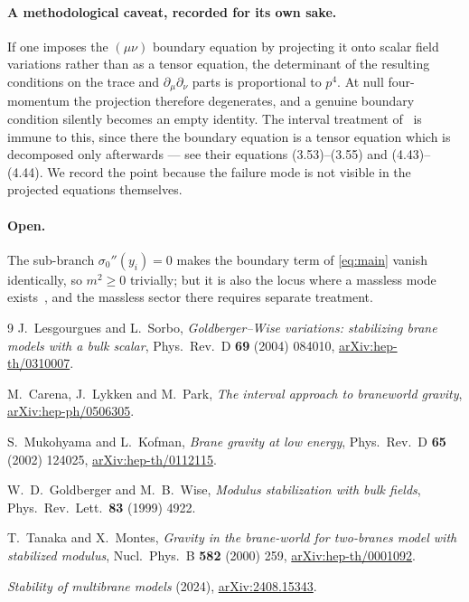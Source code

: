 \documentclass[11pt,a4paper]{article}
\newcommand{\sig}{\sigma_0}
\begin{document}
\paragraph{A methodological caveat, recorded for its own sake.}
If one imposes the $(\mu\nu)$ boundary equation by projecting it onto
scalar field variations rather than as a tensor equation, the
determinant of the resulting conditions on the trace and
$\partial_\mu\partial_\nu$ parts is proportional to $p^4$. At null
four-momentum the projection therefore degenerates, and a genuine
boundary condition silently becomes an empty identity. The interval
treatment of~\cite{CLP} is immune to this, since there the boundary
equation is a tensor equation which is decomposed only afterwards --- see
their equations (3.53)--(3.55) and (4.43)--(4.44). We record the point
because the failure mode is not visible in the projected equations
themselves.

\paragraph{Open.}
The sub-branch $\sig''(y_i)=0$ makes the boundary term of
\eqref{eq:main} vanish identically, so $m^2\ge0$ trivially; but it is
also the locus where a massless mode exists~\cite{LS,MK}, and the
massless sector there requires separate treatment.

\begin{thebibliography}{9}
 J.~Lesgourgues and L.~Sorbo,
\emph{Goldberger--Wise variations: stabilizing brane models with a bulk
scalar}, Phys.\ Rev.\ D \textbf{69} (2004) 084010,
\href{https://arxiv.org/abs/hep-th/0310007}{arXiv:hep-th/0310007}.

 M.~Carena, J.~Lykken and M.~Park,
\emph{The interval approach to braneworld gravity},
\href{https://arxiv.org/abs/hep-ph/0506305}{arXiv:hep-ph/0506305}.

 S.~Mukohyama and L.~Kofman,
\emph{Brane gravity at low energy}, Phys.\ Rev.\ D \textbf{65} (2002)
124025, \href{https://arxiv.org/abs/hep-th/0112115}{arXiv:hep-th/0112115}.

 W.~D.~Goldberger and M.~B.~Wise,
\emph{Modulus stabilization with bulk fields}, Phys.\ Rev.\ Lett.\
\textbf{83} (1999) 4922.

 T.~Tanaka and X.~Montes,
\emph{Gravity in the brane-world for two-branes model with stabilized
modulus}, Nucl.\ Phys.\ B \textbf{582} (2000) 259,
\href{https://arxiv.org/abs/hep-th/0001092}{arXiv:hep-th/0001092}.

 \emph{Stability of multibrane models} (2024),
\href{https://arxiv.org/abs/2408.15343}{arXiv:2408.15343}.
\end{thebibliography}
\end{document}
